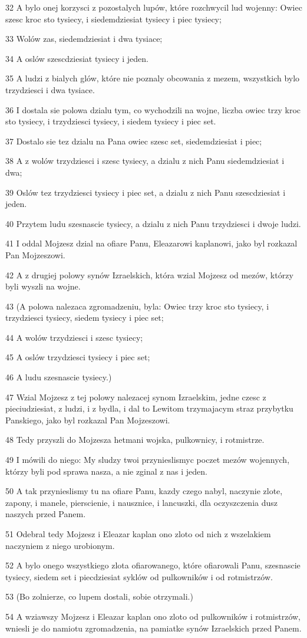 \par 32 A bylo onej korzysci z pozostalych lupów, które rozchwycil lud wojenny: Owiec szesc kroc sto tysiecy, i siedemdziesiat tysiecy i piec tysiecy;
\par 33 Wolów zas, siedemdziesiat i dwa tysiace;
\par 34 A oslów szescdziesiat tysiecy i jeden.
\par 35 A ludzi z bialych glów, które nie poznaly obcowania z mezem, wszystkich bylo trzydziesci i dwa tysiace.
\par 36 I dostala sie polowa dzialu tym, co wychodzili na wojne, liczba owiec trzy kroc sto tysiecy, i trzydziesci tysiecy, i siedem tysiecy i piec set.
\par 37 Dostalo sie tez dzialu na Pana owiec szesc set, siedemdziesiat i piec;
\par 38 A z wolów trzydziesci i szesc tysiecy, a dzialu z nich Panu siedemdziesiat i dwa;
\par 39 Oslów tez trzydziesci tysiecy i piec set, a dzialu z nich Panu szescdziesiat i jeden.
\par 40 Przytem ludu szesnascie tysiecy, a dzialu z nich Panu trzydziesci i dwoje ludzi.
\par 41 I oddal Mojzesz dzial na ofiare Panu, Eleazarowi kaplanowi, jako byl rozkazal Pan Mojzeszowi.
\par 42 A z drugiej polowy synów Izraelskich, która wzial Mojzesz od mezów, którzy byli wyszli na wojne.
\par 43 (A polowa nalezaca zgromadzeniu, byla: Owiec trzy kroc sto tysiecy, i trzydziesci tysiecy, siedem tysiecy i piec set;
\par 44 A wolów trzydziesci i szesc tysiecy;
\par 45 A oslów trzydziesci tysiecy i piec set;
\par 46 A ludu szesnascie tysiecy.)
\par 47 Wzial Mojzesz z tej polowy nalezacej synom Izraelskim, jedne czesc z pieciudziesiat, z ludzi, i z bydla, i dal to Lewitom trzymajacym straz przybytku Panskiego, jako byl rozkazal Pan Mojzeszowi.
\par 48 Tedy przyszli do Mojzesza hetmani wojska, pulkownicy, i rotmistrze.
\par 49 I mówili do niego: My sludzy twoi przynieslismyc poczet mezów wojennych, którzy byli pod sprawa nasza, a nie zginal z nas i jeden.
\par 50 A tak przynieslismy tu na ofiare Panu, kazdy czego nabyl, naczynie zlote, zapony, i manele, pierscienie, i nausznice, i lancuszki, dla oczyszczenia dusz naszych przed Panem.
\par 51 Odebral tedy Mojzesz i Eleazar kaplan ono zloto od nich z wszelakiem naczyniem z niego urobionym.
\par 52 A bylo onego wszystkiego zlota ofiarowanego, które ofiarowali Panu, szesnascie tysiecy, siedem set i piecdziesiat syklów od pulkowników i od rotmistrzów.
\par 53 (Bo zolnierze, co lupem dostali, sobie otrzymali.)
\par 54 A wziawszy Mojzesz i Eleazar kaplan ono zloto od pulkowników i rotmistrzów, wniesli je do namiotu zgromadzenia, na pamiatke synów Izraelskich przed Panem.


